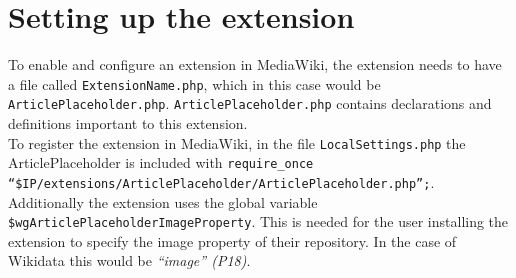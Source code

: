 \section{Setting up the extension}
	To enable and configure an extension in MediaWiki, the extension needs to have a file called \texttt{\justify ExtensionName.php}, which in this case would be \texttt{\justify ArticlePlaceholder.php}. \texttt{\justify ArticlePlaceholder.php} contains declarations and definitions important to this extension. \\
	To register the extension in MediaWiki, in the file \texttt{\justify LocalSettings.php} the ArticlePlaceholder is included with \texttt{\justify require\_once ``\$IP/extensions/ArticlePlaceholder/ArticlePlaceholder.php'';}. \\
	Additionally the extension uses the global variable \texttt{\justify \$wgArticlePlaceholderImageProperty}. This is needed for the user installing the extension to specify the image property of their repository. In the case of Wikidata this would be \textit{``image'' (P18)}. \citep{wiki:23}